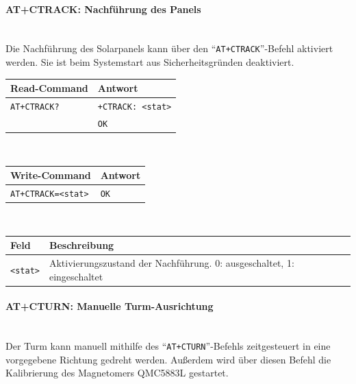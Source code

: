         \paragraph{AT+CTRACK: Nachführung des Panels}\mbox{}\\
        Die Nachführung des Solarpanels kann über den ``\texttt{AT+CTRACK}''-Befehl aktiviert werden. Sie ist beim Systemstart aus Sicherheitsgründen deaktiviert.
        
        \begin{table}[H]
            \centering
            \begin{tabular}{|p{}|p{}|}
                \hline
                \textbf{Read-Command} &\textbf{Antwort} \\
                \hline
                \texttt{AT+CTRACK?}  & \texttt{+CTRACK: <stat>}\\
                & \texttt{OK}\\
                \hline
            \end{tabular}\\[3mm]
            \begin{tabular}{|p{}|p{}|}
                \hline
                \textbf{Write-Command} &\textbf{Antwort} \\
                \hline
                \texttt{AT+CTRACK=<stat>} & \texttt{OK}\\
                \hline
            \end{tabular}\\[3mm]
            \begin{tabular}{|p{}|p{}|}
                \hline
                \textbf{Feld}       & \textbf{Beschreibung}\\
                \hline
                \texttt{<stat>}    & Aktivierungszustand der Nachführung. 0: ausgeschaltet, 1: eingeschaltet\\
                \hline
            \end{tabular}
        \end{table}
    
        \paragraph{AT+CTURN: Manuelle Turm-Ausrichtung}\mbox{}\\
        Der Turm kann manuell mithilfe des ``\texttt{AT+CTURN}''-Befehls zeitgesteuert in eine vorgegebene Richtung gedreht werden. Außerdem wird über diesen Befehl die Kalibrierung des Magnetomers QMC5883L gestartet.
        
